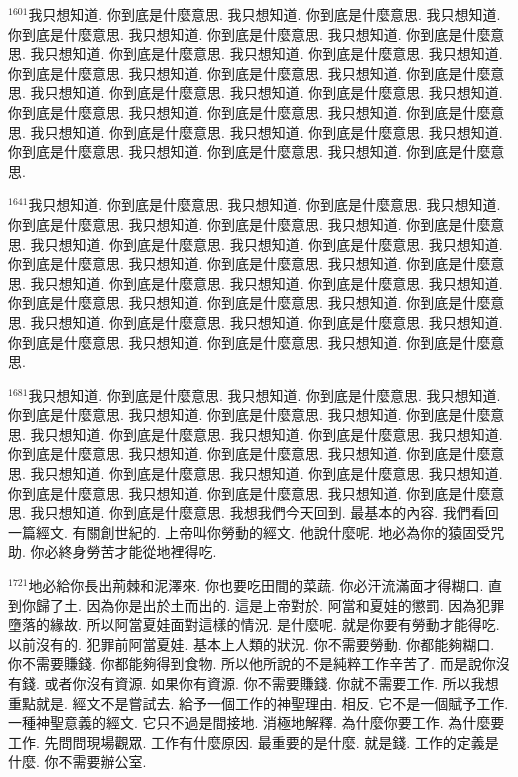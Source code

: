 \documentclass{book}
\begin{document}
$^{1601}$我只想知道.
你到底是什麼意思.
我只想知道.
你到底是什麼意思.
我只想知道.
你到底是什麼意思.
我只想知道.
你到底是什麼意思.
我只想知道.
你到底是什麼意思.
我只想知道.
你到底是什麼意思.
我只想知道.
你到底是什麼意思.
我只想知道.
你到底是什麼意思.
我只想知道.
你到底是什麼意思.
我只想知道.
你到底是什麼意思.
我只想知道.
你到底是什麼意思.
我只想知道.
你到底是什麼意思.
我只想知道.
你到底是什麼意思.
我只想知道.
你到底是什麼意思.
我只想知道.
你到底是什麼意思.
我只想知道.
你到底是什麼意思.
我只想知道.
你到底是什麼意思.
我只想知道.
你到底是什麼意思.
我只想知道.
你到底是什麼意思.
我只想知道.
你到底是什麼意思.

$^{1641}$我只想知道.
你到底是什麼意思.
我只想知道.
你到底是什麼意思.
我只想知道.
你到底是什麼意思.
我只想知道.
你到底是什麼意思.
我只想知道.
你到底是什麼意思.
我只想知道.
你到底是什麼意思.
我只想知道.
你到底是什麼意思.
我只想知道.
你到底是什麼意思.
我只想知道.
你到底是什麼意思.
我只想知道.
你到底是什麼意思.
我只想知道.
你到底是什麼意思.
我只想知道.
你到底是什麼意思.
我只想知道.
你到底是什麼意思.
我只想知道.
你到底是什麼意思.
我只想知道.
你到底是什麼意思.
我只想知道.
你到底是什麼意思.
我只想知道.
你到底是什麼意思.
我只想知道.
你到底是什麼意思.
我只想知道.
你到底是什麼意思.
我只想知道.
你到底是什麼意思.

$^{1681}$我只想知道.
你到底是什麼意思.
我只想知道.
你到底是什麼意思.
我只想知道.
你到底是什麼意思.
我只想知道.
你到底是什麼意思.
我只想知道.
你到底是什麼意思.
我只想知道.
你到底是什麼意思.
我只想知道.
你到底是什麼意思.
我只想知道.
你到底是什麼意思.
我只想知道.
你到底是什麼意思.
我只想知道.
你到底是什麼意思.
我只想知道.
你到底是什麼意思.
我只想知道.
你到底是什麼意思.
我只想知道.
你到底是什麼意思.
我只想知道.
你到底是什麼意思.
我只想知道.
你到底是什麼意思.
我只想知道.
你到底是什麼意思.
我想我們今天回到.
最基本的內容.
我們看回一篇經文.
有關創世紀的.
上帝叫你勞動的經文.
他說什麼呢.
地必為你的猿固受咒助.
你必終身勞苦才能從地裡得吃.

$^{1721}$地必給你長出荊棘和泥澤來.
你也要吃田間的菜蔬.
你必汗流滿面才得糊口.
直到你歸了土.
因為你是出於土而出的.
這是上帝對於.
阿當和夏娃的懲罰.
因為犯罪墮落的緣故.
所以阿當夏娃面對這樣的情況.
是什麼呢.
就是你要有勞動才能得吃.
以前沒有的.
犯罪前阿當夏娃.
基本上人類的狀況.
你不需要勞動.
你都能夠糊口.
你不需要賺錢.
你都能夠得到食物.
所以他所說的不是純粹工作辛苦了.
而是說你沒有錢.
或者你沒有資源.
如果你有資源.
你不需要賺錢.
你就不需要工作.
所以我想重點就是.
經文不是嘗試去.
給予一個工作的神聖理由.
相反.
它不是一個賦予工作.
一種神聖意義的經文.
它只不過是間接地.
消極地解釋.
為什麼你要工作.
為什麼要工作.
先問問現場觀眾.
工作有什麼原因.
最重要的是什麼.
就是錢.
工作的定義是什麼.
你不需要辦公室.
\end{document}
